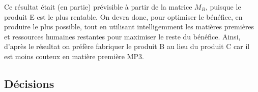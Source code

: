 Ce résultat était (en partie) prévisible à partir de la matrice $M_{B}$, puisque le produit E est le plus rentable. On devra donc, pour optimiser le bénéfice, en produire le plus possible, tout en utilisant intelligemment les matières premières et ressources humaines restantes pour maximiser le reste du bénéfice. Ainsi, d'après le résultat on préfère fabriquer le produit B au lieu du produit C car il est moins couteux en matière première MP3.


\subsection{Décisions}
